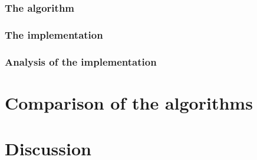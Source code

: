 \documentclass[pdftex,twoside,a4paper]{report}
\begin{document}
\subsection{The algorithm}
\subsection{The implementation}
\subsection{Analysis of the implementation}

\chapter{Comparison of the algorithms}
\label{chap:compare}
\chapter{Discussion}

	
	
\end{document}
